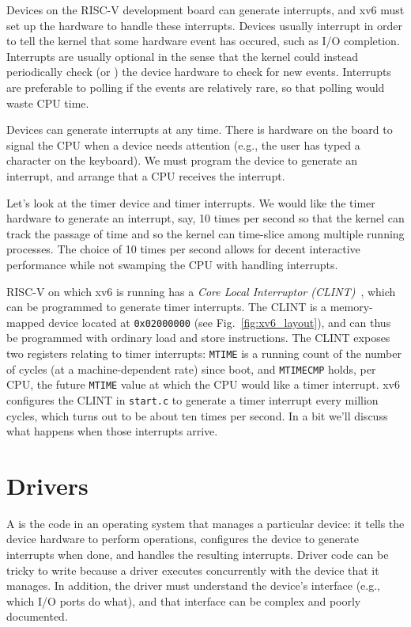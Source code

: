 Devices on the RISC-V development board can generate interrupts, and
xv6 must set up the hardware to handle these interrupts.  Devices
usually interrupt in order to tell the kernel that some hardware event
has occured, such as I/O completion.  Interrupts are usually optional
in the sense that the kernel could instead periodically check (or
) the device hardware to check for new
events.  Interrupts are preferable to polling if the events are
relatively rare, so that polling would waste CPU time.

Devices can generate interrupts
at any time.  There is hardware on the board to signal the CPU
when a device needs attention (e.g., the user has typed a character on
the keyboard). We must program the device to generate an interrupt, and
arrange that a CPU receives the interrupt. 

Let's look at the timer device and timer interrupts.  We would like
the timer hardware to generate an interrupt, say, 10 times per
second so that the kernel can track the passage of time and so the
kernel can time-slice among multiple running processes.  The choice of
10 times per second allows for decent interactive performance while
not swamping the CPU with handling interrupts.

RISC-V on which xv6 is running has a \textit{Core Local
  Interruptor (CLINT)}~\cite{u54}, which
can be programmed to generate timer interrupts.  The CLINT is a
memory-mapped device located at \lstinline{0x02000000} (see
Fig.~\ref{fig:xv6_layout}), and can thus be programmed with ordinary
load and store instructions. The CLINT exposes two registers relating
to timer interrupts: {\tt MTIME} is a running count of the number of
cycles (at a machine-dependent rate) since boot, and {\tt MTIMECMP}
holds, per CPU, the future {\tt MTIME} value at which the CPU
would like a timer interrupt.
xv6 configures the CLINT in {\tt start.c}
to generate a timer interrupt
every million cycles, which turns out to be about ten times
per second. In a bit we'll discuss what happens when those
interrupts arrive.

\section{Drivers}

A
is the code in an operating system that manages a particular device:
it tells the device hardware to perform operations,
configures the device to generate interrupts when done,
and handles the resulting interrupts.
Driver code can be tricky to write
because a driver executes concurrently with the device that it manages.  In
addition, the driver must understand the device's interface (e.g., which I/O
ports do what), and that interface can be complex and poorly documented.

